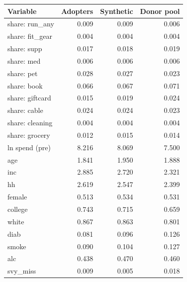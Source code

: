 \begin{tabular}{lrrr}
\toprule
Variable & Adopters & Synthetic & Donor pool \\
\midrule
share: run\_any & 0.009 & 0.009 & 0.006 \\
share: fit\_gear & 0.004 & 0.004 & 0.004 \\
share: supp & 0.017 & 0.018 & 0.019 \\
share: med & 0.006 & 0.006 & 0.006 \\
share: pet & 0.028 & 0.027 & 0.023 \\
share: book & 0.066 & 0.067 & 0.071 \\
share: giftcard & 0.015 & 0.019 & 0.024 \\
share: cable & 0.024 & 0.024 & 0.023 \\
share: cleaning & 0.004 & 0.004 & 0.004 \\
share: grocery & 0.012 & 0.015 & 0.014 \\
ln spend (pre) & 8.216 & 8.069 & 7.500 \\
age & 1.841 & 1.950 & 1.888 \\
inc & 2.885 & 2.720 & 2.321 \\
hh & 2.619 & 2.547 & 2.399 \\
female & 0.513 & 0.534 & 0.531 \\
college & 0.743 & 0.715 & 0.659 \\
white & 0.867 & 0.863 & 0.801 \\
diab & 0.081 & 0.096 & 0.126 \\
smoke & 0.090 & 0.104 & 0.127 \\
alc & 0.438 & 0.470 & 0.460 \\
svy\_miss & 0.009 & 0.005 & 0.018 \\
\bottomrule
\end{tabular}
